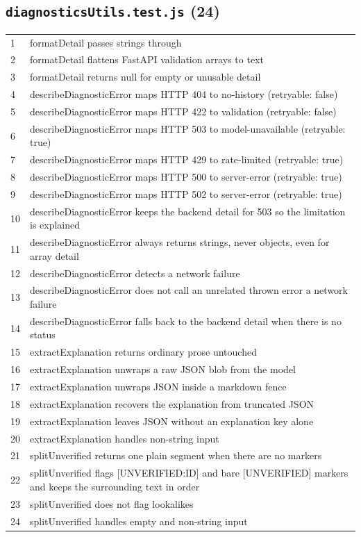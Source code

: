 \subsection*{\texttt{diagnosticsUtils.test.js} (24)}
\begin{longtable}{p{}p{}}
1 & formatDetail passes strings through \\
2 & formatDetail flattens FastAPI validation arrays to text \\
3 & formatDetail returns null for empty or unusable detail \\
4 & describeDiagnosticError maps HTTP 404 to no-history (retryable: false) \\
5 & describeDiagnosticError maps HTTP 422 to validation (retryable: false) \\
6 & describeDiagnosticError maps HTTP 503 to model-unavailable (retryable: true) \\
7 & describeDiagnosticError maps HTTP 429 to rate-limited (retryable: true) \\
8 & describeDiagnosticError maps HTTP 500 to server-error (retryable: true) \\
9 & describeDiagnosticError maps HTTP 502 to server-error (retryable: true) \\
10 & describeDiagnosticError keeps the backend detail for 503 so the limitation is explained \\
11 & describeDiagnosticError always returns strings, never objects, even for array detail \\
12 & describeDiagnosticError detects a network failure \\
13 & describeDiagnosticError does not call an unrelated thrown error a network failure \\
14 & describeDiagnosticError falls back to the backend detail when there is no status \\
15 & extractExplanation returns ordinary prose untouched \\
16 & extractExplanation unwraps a raw JSON blob from the model \\
17 & extractExplanation unwraps JSON inside a markdown fence \\
18 & extractExplanation recovers the explanation from truncated JSON \\
19 & extractExplanation leaves JSON without an explanation key alone \\
20 & extractExplanation handles non-string input \\
21 & splitUnverified returns one plain segment when there are no markers \\
22 & splitUnverified flags [UNVERIFIED:ID] and bare [UNVERIFIED] markers and keeps the surrounding text in order \\
23 & splitUnverified does not flag lookalikes \\
24 & splitUnverified handles empty and non-string input \\
\end{longtable}

